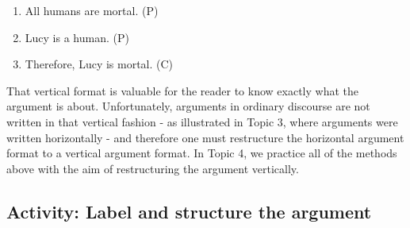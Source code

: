 \documentclass[
]{book}
\providecommand{\tightlist}{%
  \setlength{\itemsep}{0pt}\setlength{\parskip}{0pt}}
\begin{document}
\begin{enumerate}
\def\labelenumi{\arabic{enumi}.}
\tightlist
\item
  All humans are mortal. (P)\\
\item
  Lucy is a human. (P)\\
\item
  Therefore, Lucy is mortal. (C)
\end{enumerate}

That vertical format is valuable for the reader to know exactly what the argument is about. Unfortunately, arguments in ordinary discourse are not written in that vertical fashion - as illustrated in Topic 3, where arguments were written horizontally - and therefore one must restructure the horizontal argument format to a vertical argument format. In Topic 4, we practice all of the methods above with the aim of restructuring the argument vertically.

\hypertarget{activity-label-and-structure-the-argument}{%
\subsection*{Activity: Label and structure the argument}\label{activity-label-and-structure-the-argument}}
\end{document}
